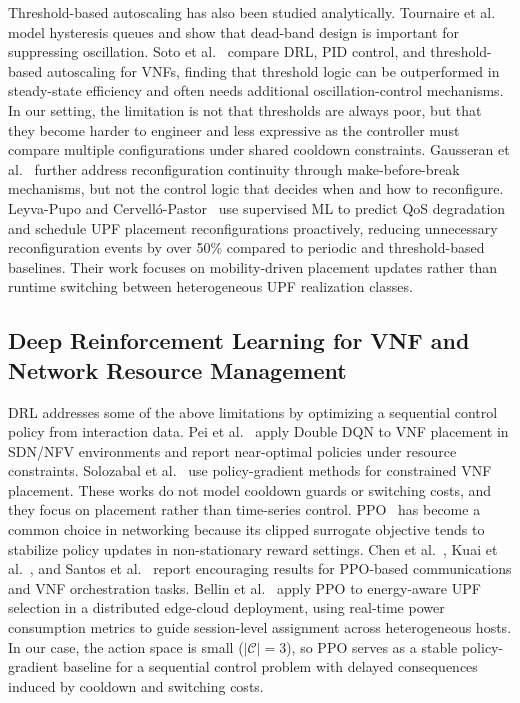 \documentclass[a4paper,fleqn]{cas-sc}
\begin{document}
Threshold-based autoscaling has also been studied analytically. Tournaire et al.~\cite{tournaire2019mascots} model hysteresis queues and show that dead-band design is important for suppressing oscillation. Soto et al.~\cite{soto2021sds} compare DRL, PID control, and threshold-based autoscaling for VNFs, finding that threshold logic can be outperformed in steady-state efficiency and often needs additional oscillation-control mechanisms. In our setting, the limitation is not that thresholds are always poor, but that they become harder to engineer and less expressive as the controller must compare multiple configurations under shared cooldown constraints. Gausseran et al.~\cite{gausseran2020icc} further address reconfiguration continuity through make-before-break mechanisms, but not the control logic that decides when and how to reconfigure. Leyva-Pupo and Cervelló-Pastor~\cite{leyva2023comnet} use supervised ML to predict QoS degradation and schedule UPF placement reconfigurations proactively, reducing unnecessary reconfiguration events by over 50\% compared to periodic and threshold-based baselines. Their work focuses on mobility-driven placement updates rather than runtime switching between heterogeneous UPF realization classes.

\subsection{Deep Reinforcement Learning for VNF and Network Resource Management}
\label{subsec:rel_drl}

DRL addresses some of the above limitations by optimizing a sequential control policy from interaction data. Pei et al.~\cite{pei2020jsac} apply Double DQN to VNF placement in SDN/NFV environments and report near-optimal policies under resource constraints. Solozabal et al.~\cite{solozabal2020jsac} use policy-gradient methods for constrained VNF placement. These works do not model cooldown guards or switching costs, and they focus on placement rather than time-series control. PPO~\cite{schulman2017ppo} has become a common choice in networking because its clipped surrogate objective tends to stabilize policy updates in non-stationary reward settings. Chen et al.~\cite{chen2022tcomm}, Kuai et al.~\cite{kuai2022tcomm}, and Santos et al.~\cite{santos2022fgcs} report encouraging results for PPO-based communications and VNF orchestration tasks. Bellin et al.~\cite{bellin2024nfvsdn} apply PPO to energy-aware UPF selection in a distributed edge-cloud deployment, using real-time power consumption metrics to guide session-level assignment across heterogeneous hosts. In our case, the action space is small ($|\mathcal{C}|=3$), so PPO serves as a stable policy-gradient baseline for a sequential control problem with delayed consequences induced by cooldown and switching costs.
\end{document}
